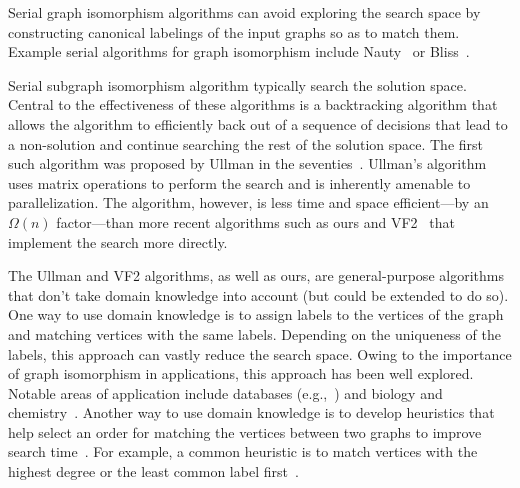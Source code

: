 Serial graph isomorphism algorithms can avoid exploring the search
space by constructing canonical labelings of the input graphs so as to
match them.
%
Example serial algorithms for graph isomorphism include
Nauty~\cite{nauty-traces} or Bliss~\cite{bliss}.
%

Serial subgraph isomorphism algorithm typically search the solution
space.
%
Central to the effectiveness of these algorithms is a
backtracking algorithm that allows the algorithm to efficiently
back out of a sequence of decisions that lead to a non-solution and
continue searching the rest of the solution space.
%
The first such algorithm was proposed by Ullman in the
seventies~\cite{ullman}.
%
Ullman's algorithm uses matrix operations to perform the search and is
inherently amenable to parallelization.  
%
The algorithm, however, is less time and space efficient---by an
$\Omega(n)$ factor---than more recent algorithms such as ours and
VF2~\cite{VF2} that implement the search more directly.
%
%


The Ullman and VF2 algorithms, as well as ours, are general-purpose
algorithms that don't take domain knowledge into account (but could
be extended to do so). 
%
One way to use domain knowledge is to assign labels to the
vertices of the graph and matching vertices with the same labels.
%
Depending on the uniqueness of the labels, this approach can vastly
reduce the search space.
%
Owing to the importance of graph isomorphism in applications, this
approach has been well explored.
%
Notable areas of application include databases
(e.g.,~\cite{SZXJ-taming-2008,subgraphdatabase,LHKL-indepth-2012,HLL-turboiso-2013})
and biology and
chemistry~\cite{BGP+subgraph-2013,CGV-performance-2013,subgraphsinchemistry}.
%
Another way to use domain knowledge is to develop heuristics that
help select an order for matching the vertices between two graphs to
improve search time~\cite{ullman-bit-2010}. 
%
For example, a common heuristic is to match vertices with the
highest degree or the least common label
first~\cite{TY-chordality-1984,shier-chordal-1984}.
%

